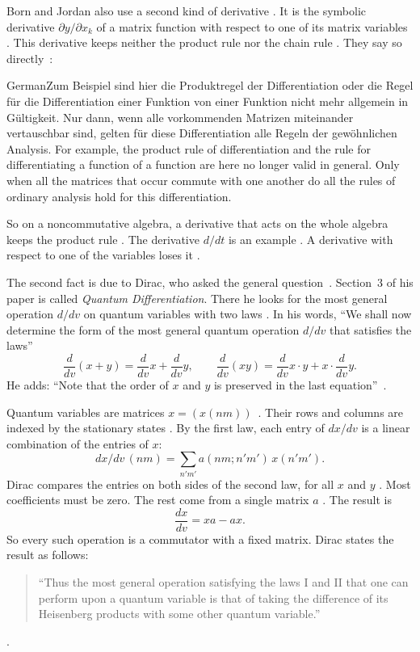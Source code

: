 Born and Jordan also use a second kind of derivative \cite[\S 2,
p.~862]{BornJordan1925}. It is the symbolic derivative $\partial y/\partial
x_k$ of a matrix function with respect to one of its matrix variables \cite[\S
2, p.~862]{BornJordan1925}. This derivative keeps neither the product rule nor
the chain rule \cite[\S 2, p.~862]{BornJordan1925}. They say so directly~\cite[\S 2, p.~862]{BornJordan1925}:
\begin{originalquote}{German}{Zum Beispiel sind hier die Produktregel der
Differentiation oder die Regel f\"ur die Differentiation einer Funktion von
einer Funktion nicht mehr allgemein in G\"ultigkeit. Nur dann, wenn alle
vorkommenden Matrizen miteinander vertauschbar sind, gelten f\"ur diese
Differentiation alle Regeln der gew\"ohnlichen Analysis.} For example, the
product rule of differentiation and the rule for differentiating a function of
a function are here no longer valid in general. Only when all the matrices
that occur commute with one another do all the rules of ordinary analysis hold
for this differentiation. \end{originalquote} \noindent So on a noncommutative
algebra, a derivative that acts on the whole algebra keeps the product rule
\cite[\S 2, p.~862]{BornJordan1925}. The derivative $d/dt$ is an example \cite[\S 2, p.~862]{BornJordan1925}. A derivative with respect to one
of the variables loses it \cite[\S 2, p.~862]{BornJordan1925}.

The second fact is due to Dirac, who asked the general question~\cite{Dirac1925}. Section~3 of his paper
is called \emph{Quantum Differentiation}. There he looks for the most
general operation $d/dv$ on quantum variables with two laws \cite[\S 3, p.~645]{Dirac1925}. In his words,
``We shall now determine the form of the most general quantum operation
$d/dv$ that satisfies the laws''
\[
  \frac{d}{dv}(x+y) = \frac{d}{dv}x + \frac{d}{dv}y,
  \qquad
  \frac{d}{dv}(xy) = \frac{d}{dv}x \cdot y + x \cdot \frac{d}{dv}y .
\]
He adds: ``Note that the order of $x$ and $y$ is preserved in the last
equation''~\cite[\S 3, p.~645]{Dirac1925}.

Quantum variables are matrices $x = (x(nm))$~\cite[\S 3, pp.~646--647]{Dirac1925}. Their rows and columns are
indexed by the stationary states \cite[\S 3, p.~645]{Dirac1925}. By the first law, each entry of $dx/dv$
is a linear combination of the entries of $x$:
\[
  dx/dv\,(nm) = \sum_{n'm'} a(nm;n'm')\,x(n'm').
\]
Dirac compares the entries on both sides of the second law, for all $x$ and
$y$ \cite[\S 3, p.~647]{Dirac1925}. Most coefficients must be zero. The rest come from a single matrix
$a$ \cite[\S 3, p.~647]{Dirac1925}.
The result is
\[
  \frac{dx}{dv} = xa - ax .
\]
So every such operation is a commutator with a fixed matrix. Dirac states
the result as follows:
\begin{quote}\small
``Thus the most general operation satisfying the laws I and II that one can
perform upon a quantum variable is that of taking the difference of its
Heisenberg products with some other quantum variable.''
\end{quote}
\noindent\cite[\S 3, pp.~646--647]{Dirac1925}.

